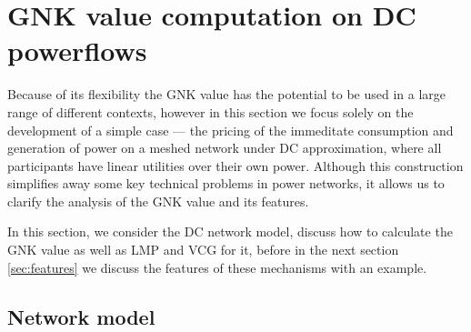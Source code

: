 \section{GNK value computation on DC powerflows}\label{more_involved}

Because of its flexibility the GNK value has the potential to be used in a large range of different contexts,
however in this section we focus solely on the development of a simple case --- the pricing of the immeditate consumption and generation of power on a meshed network under DC approximation, where all participants have linear utilities over their own power.
Although this construction simplifies away some key technical problems in power networks, it allows us to clarify the analysis of the GNK value and its features.

In this section, we consider the DC network model, discuss how to calculate the GNK value as well as LMP and VCG for it, before in the next section \ref{sec:features} we discuss the features of these mechanisms with an example.

\subsection{Network model}\label{sec:the_setup}


